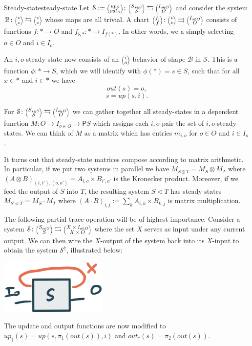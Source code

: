 \documentclass[12pt, a4paper]{article}
\theoremstyle{definition}
\theoremstyle{plain}
\theoremstyle{plain}
\theoremstyle{plain}
\theoremstyle{plain}
\theoremstyle{plain}
\theoremstyle{remark}
\theoremstyle{remark}
\newcommand{\mc}[1]{\mathcal{#1}}
\newcommand{\lens}[2]{\scaleobj{0.6}{\begin{pmatrix} \scaleobj{1.3}{{#1}} \\ \scaleobj{1.3}{{#2}} \end{pmatrix}}}
\begin{document}
\begin{tcdefinition}{Steady-state}{steady-state}
	Let $\mc{S} := \lens{up_S}{out_S} \colon \lens{S_{s \in S}}{S} \leftrightarrows \lens{I_{o \in O}}{O}$ and consider the system $\mc{B} \colon \lens{*}{*} \leftrightarrows \lens{*}{*}$ whose maps are all trivial. A chart $\lens{f_\flat}{f} \colon \lens{*}{*} \rightrightarrows \lens{I_{o \in O}}{O}$ consists of functions $f \colon * \rightarrow O$ and $f_{\flat,*} \colon * \rightarrow I_{f(*)}$. In other words, we a simply selecting $o \in O$ and $i \in I_o$. 

	An $i,o$-steady-state now consists of an $\lens{i}{o}$-behavior of shape $\mc{B}$ in $\mc{S}$. This is a function $\phi \colon * \rightarrow S$, which we will identify with $\phi(*) = s \in S$, such that for all $x \in *$ and $i \in *$ we have
	$$out(s) = o, $$
	$$s = up(s,i).$$
\end{tcdefinition}

For $\mc{S} \colon \lens{S_{s \in S}}{S} \leftrightarrows \lens{I_{o \in O}}{O}$ we can gather together all steady-states in a dependent function $M: O \rightarrow I_{o \in O} \rightarrow \mathsf{P}S$ which assigns each $i,o$-pair the set of $i,o$-steady-states. We can think of $M$ as a matrix which has entries $m_{i,o}$ for $o \in O$ and $i \in I_o$.

It turns out that steady-state matrices compose according to matrix arithmetic. In particular, if we put two systems in parallel we have $M_{S \otimes T} = M_S \otimes M_T $ where $(A \otimes B)_{(i,i'),(o,o')} = A_{i,o} \times B_{i',o'}$ is the Kronecker product. Moreover, if we feed the output of $S$ into $T$, the resulting system $S \triangleleft T$ has steady states $M_{S \triangleleft T} = M_S \cdot M_T$ where $(A \cdot B)_{i,j} := \sum_{k} A_{i,k} \times B_{k,j}$ is matrix multiplication.

The following partial trace operation will be of highest importance: Consider a system $\mc{S} \colon \lens{S_{s \in S}}{S} \leftrightarrows \lens{X \times I_{o \in O} }{X \times O}$ where the set $X$ serves as input under any current output. We can then wire the $X$-output of the system back into its $X$-input to obtain the system $\mc{S}^\dagger$, illustrated below:
\begin{center}
\includegraphics[width = 0.4\textwidth]{trace.jpg}
\end{center}
The update and output functions are now modified to $up_\dagger(s) = up(s,\pi_1(out(s)),i)$ and $out_\dagger(s) = \pi_2(out(s))$.
\end{document}
